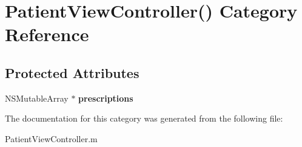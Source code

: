 \hypertarget{category_patient_view_controller_07_08}{}\section{Patient\+View\+Controller() Category Reference}
\label{category_patient_view_controller_07_08}
\subsection*{Protected Attributes}
\begin{DoxyCompactItemize}
\item 
\hypertarget{category_patient_view_controller_07_08_a342561bab92448e254982cc47cb519d8}{}N\+S\+Mutable\+Array $\ast$ {\bfseries prescriptions}\label{category_patient_view_controller_07_08_a342561bab92448e254982cc47cb519d8}

\end{DoxyCompactItemize}


The documentation for this category was generated from the following file\+:\begin{DoxyCompactItemize}
\item 
Patient\+View\+Controller.\+m\end{DoxyCompactItemize}
